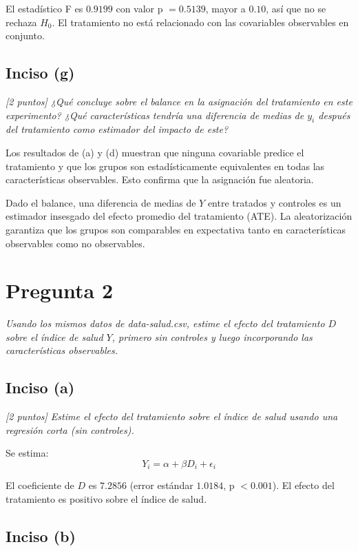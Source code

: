 \documentclass[12pt]{article}
\begin{document}
El estadístico F es $0.9199$ con valor p $= 0.5139$, mayor a $0.10$, así que no se rechaza $H_0$. El tratamiento no está relacionado con las covariables observables en conjunto.

\subsection*{Inciso (g)}

\textit{[2 puntos] ¿Qué concluye sobre el balance en la asignación del tratamiento en este experimento? ¿Qué características tendría una diferencia de medias de $y_i$ después del tratamiento como estimador del impacto de este?}

Los resultados de (a) y (d) muestran que ninguna covariable predice el tratamiento y que los grupos son estadísticamente equivalentes en todas las características observables. Esto confirma que la asignación fue aleatoria.

Dado el balance, una diferencia de medias de $Y$ entre tratados y controles es un estimador insesgado del efecto promedio del tratamiento (ATE). La aleatorización garantiza que los grupos son comparables en expectativa tanto en características observables como no observables.

\section{Pregunta 2}

\textit{Usando los mismos datos de data-salud.csv, estime el efecto del tratamiento $D$ sobre el índice de salud $Y$, primero sin controles y luego incorporando las características observables.}

\subsection*{Inciso (a)}

\textit{[2 puntos] Estime el efecto del tratamiento sobre el índice de salud usando una regresión corta (sin controles).}

Se estima:
\begin{equation}
Y_i = \alpha + \beta D_i + \epsilon_i
\end{equation}



El coeficiente de $D$ es $7.2856$ (error estándar $1.0184$, p $< 0.001$). El efecto del tratamiento es positivo sobre el índice de salud.

\subsection*{Inciso (b)}
\end{document}
